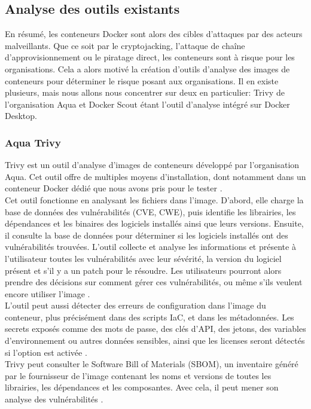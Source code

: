 \subsection{Analyse des outils existants}
En résumé, les conteneurs Docker sont alors des cibles d'attaques par des acteurs malveillants. Que ce soit par le cryptojacking, l'attaque de chaîne d'approvisionnement ou le piratage direct, les conteneurs sont à risque pour les organisations. Cela a alors motivé la création d'outils d'analyse des images de conteneurs pour déterminer le risque posant aux organisations. Il en existe plusieurs, mais nous allons nous concentrer sur deux en particulier: Trivy de l'organisation Aqua et Docker Scout étant l'outil d'analyse intégré sur Docker Desktop. 
\subsubsection{Aqua Trivy}
Trivy est un outil d'analyse d'images de conteneurs développé par l'organisation Aqua. Cet outil offre de multiples moyens d'installation, dont notamment dans un conteneur Docker dédié que nous avons pris pour le tester \cite{trivy2026container}. \\
\newline
Cet outil fonctionne en analysant les fichiers dans l'image. D'abord, elle charge la base de données des vulnérabilités (CVE, CWE), puis identifie les librairies, les dépendances et les binaires des logiciels installés ainsi que leurs versions. Ensuite, il consulte la base de données pour déterminer si les logiciels installés ont des vulnérabilités trouvées. L'outil collecte et analyse les informations et présente à l'utilisateur toutes les vulnérabilités avec leur sévérité, la version du logiciel présent et s'il y a un patch pour le résoudre. Les utilisateurs pourront alors prendre des décisions sur comment gérer ces vulnérabilités, ou même s'ils veulent encore utiliser l'image \cite{trivy2026container}. \\
\newline
L'outil peut aussi détecter des erreurs de configuration dans l'image du conteneur, plus précisément dans des scripts IaC, et dans les métadonnées. Les secrets exposés comme des mots de passe, des clés d'API, des jetons, des variables d'environnement ou autres données sensibles, ainsi que les licenses seront détectés si l'option est activée \cite{trivy2026container}. \\
\newline
Trivy peut consulter le Software Bill of Materials (SBOM), un inventaire généré par le fournisseur de l'image contenant les noms et versions de toutes les librairies, les dépendances et les composantes. Avec cela, il peut mener son analyse des vulnérabilités \cite{trivy2026container}.
